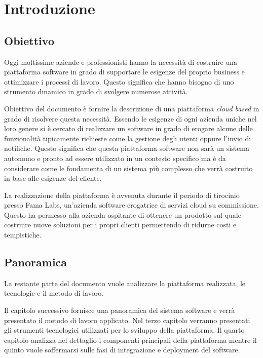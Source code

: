 \chapter{Introduzione}
\section{Obiettivo}
Oggi moltissime aziende e professionisti hanno la necessità di costruire
una piattaforma software in grado di supportare le esigenze del proprio business e
ottimizzare i processi di lavoro. Questo significa che hanno bisogno di uno strumento dinamico
in grado di svolgere numerose attività.

Obiettivo del documento è fornire la descrizione di una piattaforma \textit{cloud based} in grado di risolvere questa necessità.
Essendo le esigenze di ogni azienda uniche nel loro genere si è cercato di realizzare un software in grado
di erogare alcune delle funzionalità tipicamente richieste come la gestione degli utenti oppure l'invio di notifiche.
Questo significa che questa piattaforma software non sarà un sistema autonomo e pronto ad essere utilizzato in un contesto specifico ma
è da considerare come le fondamenta di un sistema più complesso che verrà costruito in base alle esigenze del cliente.

La realizzazione della piattaforma è avvenuta durante il periodo di tirocinio presso Fama Labs,
un'azienda software erogatrice di servizi cloud su commissione.
Questo ha permesso alla azienda ospitante di ottenere un prodotto sul quale costruire nuove soluzioni per i propri clienti
permettendo di ridurne costi e tempistiche.

\section{Panoramica}
La restante parte del documento vuole analizzare la piattaforma realizzata, le tecnologie e il metodo di lavoro.

Il capitolo successivo fornisce una panoramica del sistema software
e verrà presentato il metodo di lavoro applicato. Nel terzo capitolo verranno presentati
gli strumenti tecnologici utilizzati per lo sviluppo della piattaforma. Il quarto capitolo
analizza nel dettaglio i componenti principali della piattaforma mentre il quinto
vuole soffermarsi sulle fasi di integrazione e deployment del software.
